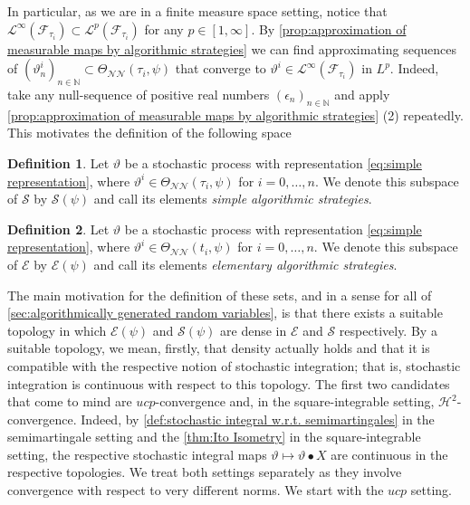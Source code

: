 \documentclass[11pt,a4paper,twoside,openany]{report}
\theoremstyle{plain} %
\theoremstyle{definition} %
\newtheorem{definition}[definition]{Definition}
\theoremstyle{remark} %
\begin{document}
In particular, as we are in a finite measure space setting, notice that \(\mathcal{L}^{\infty}(\mathcal{F}_{\tau_i})\subset\mathcal{L}^{p}(\mathcal{F}_{\tau_i})\) for any \(p\in[1,\infty]\). By \cref{prop:approximation of measurable maps by algorithmic strategies} we can find approximating sequences of \((\vartheta^i_n)_{n\in\mathbb{N}}\subset\Theta_{\mathcal{NN}}(\tau_i,\psi)\) that converge to \(\vartheta^i\in\mathcal{L}^{\infty}(\mathcal{F}_{\tau_i})\) in \(L^p\). Indeed, take any null-sequence of positive real numbers \((\epsilon_n)_{n\in\mathbb{N}}\) and apply \cref{prop:approximation of measurable maps by algorithmic strategies} (2) repeatedly. This motivates the definition of the following space
\begin{definition}
    Let \(\vartheta\) be a stochastic process with representation \cref{eq:simple representation}, where \(\vartheta^i\in\Theta_{\mathcal{NN}}(\tau_i,\psi)\) for \(i=0,\dots,n\). We denote this subspace of \(\mathcal{S}\) by \(\mathcal{S}(\psi)\) and call its elements \textit{simple algorithmic strategies}.
\end{definition}
\begin{definition}
    Let \(\vartheta\) be a stochastic process with representation \cref{eq:simple representation}, where \(\vartheta^i\in\Theta_{\mathcal{NN}}(t_i,\psi)\) for \(i=0,\dots,n\). We denote this subspace of \(\mathcal{E}\) by \(\mathcal{E}(\psi)\) and call its elements \textit{elementary algorithmic strategies}.
\end{definition}
The main motivation for the definition of these sets, and in a sense for all of \cref{sec:algorithmically generated random variables}, is that there exists a suitable topology in which \(\mathcal{E}(\psi)\) and \(\mathcal{S}(\psi)\) are dense in \(\mathcal{E}\) and \(\mathcal{S}\) respectively. By a suitable topology, we mean, firstly, that density actually holds and that it is compatible with the respective notion of stochastic integration; that is, stochastic integration is continuous with respect to this topology. The first two candidates that come to mind are \(ucp\)-convergence and, in the square-integrable setting, \(\mathcal{H}^2\)-convergence. Indeed, by \cref{def:stochastic integral w.r.t. semimartingales} in the semimartingale setting and the \cref{thm:Ito Isometry} in the square-integrable setting, the respective stochastic integral maps \(\vartheta\mapsto \vartheta\bullet X\) are continuous in the respective topologies. We treat both settings separately as they involve convergence with respect to very different norms. We start with the \(ucp\) setting. 
\end{document}
